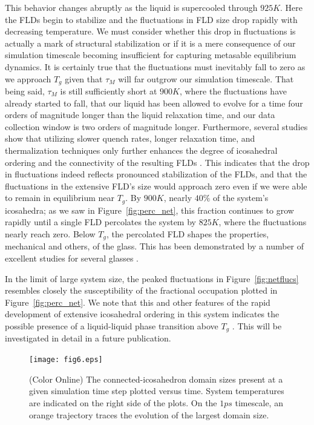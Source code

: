 \documentclass[aps,prl,preprint,showpacs,amsmath,floatfix,superscriptaddress]{revtex4}
\begin{document}
This behavior changes abruptly as the liquid is supercooled
through $925K$. Here the FLDs begin to stabilize and the
fluctuations in FLD size drop rapidly with decreasing temperature.
We must consider whether this drop in fluctuations is actually a
mark of structural stabilization or if it is a mere consequence of
our simulation timescale becoming insufficient for capturing
metasable equilibrium dynamics. It is certainly true that the
fluctuations must inevitably fall to zero as we approach $T_{g}$
given that $\tau_{M}$ will far outgrow our simulation timescale.
That being said, $\tau_{M}$ is still sufficiently short at $900K$,
where the fluctuations have already started to fall, that our
liquid has been allowed to evolve for a time four orders of
magnitude longer than the liquid relaxation time, and our data
collection window is two orders of magnitude longer. Furthermore,
several studies show that utilizing slower quench rates, longer
relaxation time, and thermalization techniques only further
enhances the degree of icosahedral ordering and the connectivity
of the resulting FLDs \cite{Ding2014,Mendelev2015}. This indicates
that the drop in fluctuations indeed reflects pronounced
stabilization of the FLDs, and that the fluctuations in the
extensive FLD's size would approach zero even if we were able to
remain in equilibrium near $T_{g}$. By $900K$, nearly $40\%$ of
the system's icosahedra; as we saw in Figure~\ref{fig:perc_net},
this fraction continues to grow rapidly until a single FLD
percolates the system by $825K$, where the fluctuations nearly
reach zero.  Below $T_{g}$, the percolated FLD shapes the
properties, mechanical and others, of the glass. This has been
demonstrated by a number of excellent studies for several glasses
\cite{Baumer2013, Wu2013, Lee2011, Zhang2014, Wakeda2010, Liu2014,
Wang2014}.

In the limit of large system size, the peaked fluctuations in
Figure~\ref{fig:netflucs} resembles closely the susceptibility
of the fractional occupation plotted in Figure~\ref{fig:perc_net}.
We note that this and other features of the rapid development of extensive
icosahedral ordering in this system indicates the possible
presence of a liquid-liquid phase transition above $T_{g}$
\cite{Tanaka2000}. This will be investigated in detail in a future
publication.

\begin{figure}[t]
\texttt{[image: fig6.eps]}
\caption{(Color Online) The connected-icosahedron domain sizes
present at a given simulation time step plotted versus time.
System temperatures are indicated on the right side of the plots.
On the $1ps$ timescale, an orange trajectory traces the evolution
of the largest domain size.} \label{fig:timeflucs}
\end{figure}
\end{document}

